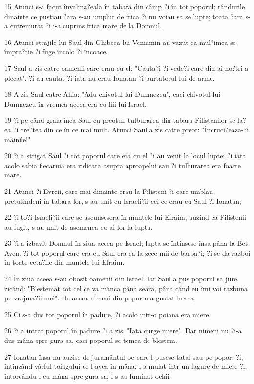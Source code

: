 \par 15 Atunci s-a facut învalma?eala în tabara din câmp ?i în tot poporul; rândurile dinainte ce pustiau ?ara s-au umplut de frica ?i nu voiau sa se lupte; toata ?ara s-a cutremurat ?i i-a cuprins frica mare de la Domnul.
\par 16 Atunci strajile lui Saul din Ghibeea lui Veniamin au vazut ca mul?imea se împra?tie ?i fuge încolo ?i încoace.
\par 17 Saul a zis catre oamenii care erau cu el: "Cauta?i ?i vede?i care din ai no?tri a plecat". ?i au cautat ?i iata nu erau Ionatan ?i purtatorul lui de arme.
\par 18 A zis Saul catre Ahia: "Adu chivotul lui Dumnezeu", caci chivotul lui Dumnezeu în vremea aceea era cu fiii lui Israel.
\par 19 ?i pe când graia înca Saul cu preotul, tulburarea din tabara Filistenilor se la?ea ?i cre?tea din ce în ce mai mult. Atunci Saul a zis catre preot: "Încruci?eaza-?i mâinile!"
\par 20 ?i a strigat Saul ?i tot poporul care era cu el ?i au venit la locul luptei ?i iata acolo sabia fiecaruia era ridicata asupra aproapelui sau ?i tulburarea era foarte mare.
\par 21 Atunci ?i Evreii, care mai dinainte erau la Filisteni ?i care umblau pretutindeni în tabara lor, s-au unit cu Israeli?ii cei ce erau cu Saul ?i Ionatan;
\par 22 ?i to?i Israeli?ii care se ascunsesera în muntele lui Efraim, auzind ca Filistenii au fugit, s-au unit de asemenea cu ai lor la lupta.
\par 23 ?i a izbavit Domnul în ziua aceea pe Israel; lupta se întinsese însa pâna la Bet-Aven. ?i tot poporul care era cu Saul era ca la zece mii de barba?i; ?i se da razboi în toate ceta?ile din muntele lui Efraim.
\par 24 În ziua aceea s-au obosit oamenii din Israel. Iar Saul a pus poporul sa jure, zicând: "Blestemat tot cel ce va mânca pâna seara, pâna când eu îmi voi razbuna pe vrajma?ii mei". De aceea nimeni din popor n-a gustat hrana,
\par 25 Ci s-a dus tot poporul în padure, ?i acolo intr-o poiana era miere.
\par 26 ?i a intrat poporul în padure ?i a zis: "Iata curge miere". Dar nimeni nu ?i-a dus mâna spre gura sa, caci poporul se temea de blestem.
\par 27 Ionatan însa nu auzise de juramântul pe care-l pusese tatal sau pe popor; ?i, întinzând vârful toiagului ce-l avea în mâna, l-a muiat într-un fagure de miere ?i, întorcându-l cu mâna spre gura sa, i s-au luminat ochii.
